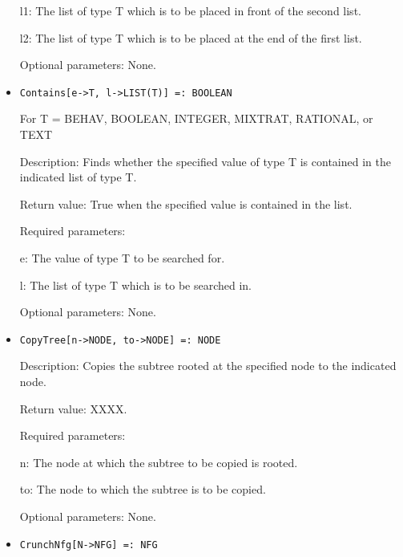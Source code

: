 \begin{itemize}
\bd
\item
[l1:] The list of type T which is to be placed in front of the second
list.
\item 
[l2:] The list of type T which is to be placed at the end of the first
list.
\ed

\item
[Optional parameters:] None.
\ed

\item
\protect \large \begin{verbatim}
Contains[e->T, l->LIST(T)] =: BOOLEAN
\end{verbatim}\normalsize

For T = BEHAV, BOOLEAN, INTEGER, MIXTRAT, RATIONAL, or TEXT

\bd
\item
[Description:] Finds whether the specified value of type T is
contained in the indicated list of type T.
\item 
[Return value:] True when the specified value is contained in the
list.
\item
[Required parameters:]\hfil\null
	
\bd
\item	
[e:] The value of type T to be searched for.
\item
[l:] The list of type T which is to be searched in.
\ed

\item
[Optional parameters:] None.
\ed

\item

\protect \large \begin{verbatim}
CopyTree[n->NODE, to->NODE] =: NODE
\end{verbatim}\normalsize

\bd
\item
[Description:] Copies the subtree rooted at the specified node to the
indicated node.
\item
[Return value:] XXXX.
\item
[Required parameters:]\hfil\null

\bd
\item	
[n:] The node at which the subtree to be copied is rooted.
\item
[to:] The node to which the subtree is to be copied.
\ed

\item
[Optional parameters:] None.
\ed

\item
\protect \large \begin{verbatim}
CrunchNfg[N->NFG] =: NFG
\end{verbatim}\normalsize


\end{itemize}
